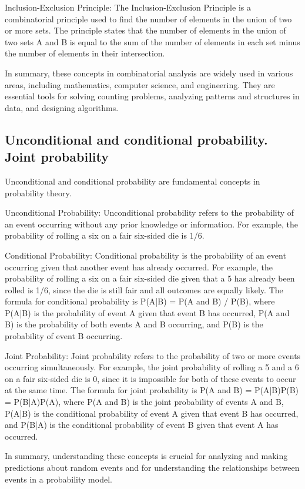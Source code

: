 \documentclass[12pt, a4paper, oneside]{article}
\begin{document}
Inclusion-Exclusion Principle: The Inclusion-Exclusion Principle is a combinatorial principle used to find the number of elements in the union of two or more sets. The principle states that the number of elements in the union of two sets A and B is equal to the sum of the number of elements in each set minus the number of elements in their intersection.

In summary, these concepts in combinatorial analysis are widely used in various areas, including mathematics, computer science, and engineering. They are essential tools for solving counting problems, analyzing patterns and structures in data, and designing algorithms.
\subsection{ Unconditional and conditional probability. Joint probability }
Unconditional and conditional probability are fundamental concepts in probability theory.

Unconditional Probability: Unconditional probability refers to the probability of an event occurring without any prior knowledge or information. For example, the probability of rolling a six on a fair six-sided die is 1/6.

Conditional Probability: Conditional probability is the probability of an event occurring given that another event has already occurred. For example, the probability of rolling a six on a fair six-sided die given that a 5 has already been rolled is 1/6, since the die is still fair and all outcomes are equally likely. The formula for conditional probability is P(A|B) = P(A and B) / P(B), where P(A|B) is the probability of event A given that event B has occurred, P(A and B) is the probability of both events A and B occurring, and P(B) is the probability of event B occurring.

Joint Probability: Joint probability refers to the probability of two or more events occurring simultaneously. For example, the joint probability of rolling a 5 and a 6 on a fair six-sided die is 0, since it is impossible for both of these events to occur at the same time. The formula for joint probability is P(A and B) = P(A|B)P(B) = P(B|A)P(A), where P(A and B) is the joint probability of events A and B, P(A|B) is the conditional probability of event A given that event B has occurred, and P(B|A) is the conditional probability of event B given that event A has occurred.

In summary, understanding these concepts is crucial for analyzing and making predictions about random events and for understanding the relationships between events in a probability model.
\end{document}

